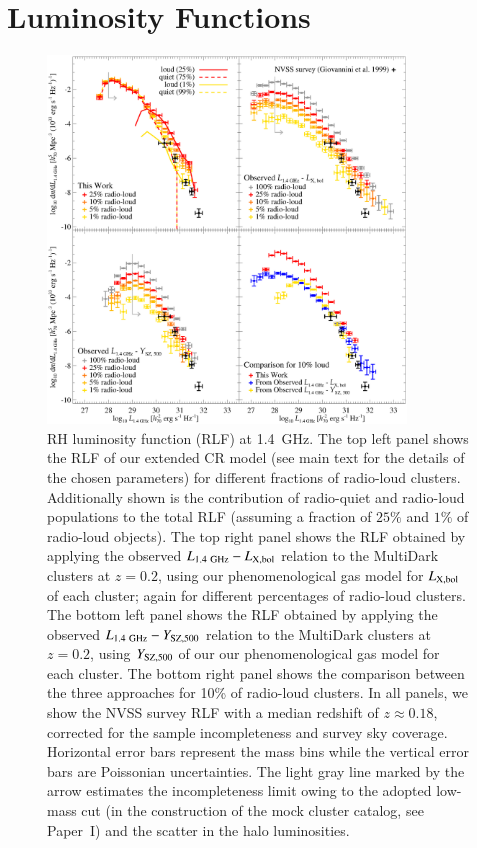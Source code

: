\documentclass[useAMS,usenatbib]{mn2e}
\begin{document}
\section{Luminosity Functions}
\label{sec:5}

\begin{figure} 
\centering
\includegraphics[width=0.85\textwidth]{figures/RLFs_1.4.eps}
\caption{RH luminosity function (RLF) at 1.4~GHz. The top left panel shows
  the RLF of our extended CR model (see main text for the details of the chosen
  parameters) for different fractions of radio-loud clusters. Additionally shown
  is the contribution of radio-quiet and radio-loud populations to the total RLF
  (assuming a fraction of $25\%$ and $1\%$ of radio-loud objects). The top right
  panel shows the RLF obtained by applying the observed
  $L_{1.4~{\mathrm{GHz}}}-L_{{\mathrm{X,bol}}}$ relation to the MultiDark clusters at $z =
  0.2$, using our phenomenological gas model for $L_{{\mathrm{X,bol}}}$ of each
  cluster; again for different percentages of radio-loud clusters.  The bottom
  left panel shows the RLF obtained by applying the observed
  $L_{1.4~{\mathrm{GHz}}}-Y_{{\mathrm{SZ}}, 500}$ relation to the MultiDark clusters at $z
  = 0.2$, using $Y_{{\mathrm{SZ}}, 500}$ of our our phenomenological gas model
  for each cluster. The bottom right panel shows the comparison between the
  three approaches for 10\% of radio-loud clusters. In all panels, we show the
  NVSS survey RLF \citep{1999NewA....4..141G} with a median redshift of 
  $z\approx 0.18$, corrected for the sample incompleteness and survey sky coverage. 
  Horizontal error bars represent the mass bins while the vertical error bars are Poissonian 
  uncertainties. The light gray line marked by the arrow estimates the incompleteness limit owing
  to the adopted low-mass cut (in the construction of the mock cluster catalog, see Paper~I)
  and the scatter in the halo luminosities.}
\label{fig:RLF_1.4}
\end{figure}
\end{document}
